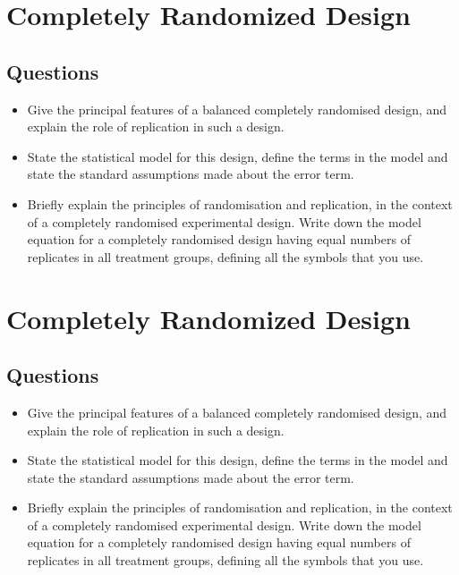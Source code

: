

\section{Completely Randomized Design}

\subsection{Questions}
\begin{itemize}
	\item Give the principal features of a  balanced completely randomised design, and
	explain the role of replication in such a design.  \item State the statistical model for
	this design, define the terms in the model and state the standard assumptions
	made about the error term.
	\item Briefly explain the principles of randomisation and replication, in the
	context of a completely randomised experimental design. Write down the model equation for a completely randomised design
	having equal numbers of replicates in all treatment groups, defining all
	the symbols that you use.
\end{itemize}\section{Completely Randomized Design}

\subsection{Questions}
\begin{itemize}
	\item Give the principal features of a  balanced completely randomised design, and
	explain the role of replication in such a design.  \item State the statistical model for
	this design, define the terms in the model and state the standard assumptions
	made about the error term.
	\item Briefly explain the principles of randomisation and replication, in the
	context of a completely randomised experimental design. Write down the model equation for a completely randomised design
	having equal numbers of replicates in all treatment groups, defining all
	the symbols that you use.
\end{itemize}
